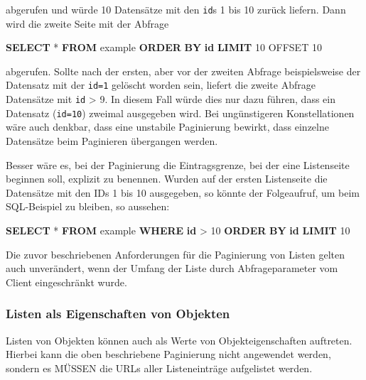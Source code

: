 \documentclass[,a4paper]{article}
\newenvironment{Shaded}{}{}
\newcommand{\KeywordTok}[1]{\textcolor[rgb]{0.00,0.44,0.13}{\textbf{{#1}}}}
\newcommand{\DecValTok}[1]{\textcolor[rgb]{0.25,0.63,0.44}{{#1}}}
\newcommand{\NormalTok}[1]{{#1}}
\begin{document}
abgerufen und würde 10 Datensätze mit den \texttt{id}s 1 bis 10 zurück
liefern. Dann wird die zweite Seite mit der Abfrage

\begin{Shaded}
\begin{Highlighting}[]
\KeywordTok{SELECT} \NormalTok{* }\KeywordTok{FROM} \NormalTok{example }\KeywordTok{ORDER} \KeywordTok{BY} \KeywordTok{id} \KeywordTok{LIMIT} \DecValTok{10} \NormalTok{OFFSET }\DecValTok{10}
\end{Highlighting}
\end{Shaded}

abgerufen. Sollte nach der ersten, aber vor der zweiten Abfrage
beispielsweise der Datensatz mit der \texttt{id=1} gelöscht worden sein,
liefert die zweite Abfrage Datensätze mit \texttt{id} \textgreater{} 9.
In diesem Fall würde dies nur dazu führen, dass ein Datensatz
(\texttt{id=10}) zweimal ausgegeben wird. Bei ungünstigeren
Konstellationen wäre auch denkbar, dass eine unstabile Paginierung
bewirkt, dass einzelne Datensätze beim Paginieren übergangen werden.

Besser wäre es, bei der Paginierung die Eintragsgrenze, bei der eine
Listenseite beginnen soll, explizit zu benennen. Wurden auf der ersten
Listenseite die Datensätze mit den IDs 1 bis 10 ausgegeben, so könnte
der Folgeaufruf, um beim SQL-Beispiel zu bleiben, so aussehen:

\begin{Shaded}
\begin{Highlighting}[]
\KeywordTok{SELECT} \NormalTok{* }\KeywordTok{FROM} \NormalTok{example }\KeywordTok{WHERE} \KeywordTok{id} \NormalTok{> }\DecValTok{10} \KeywordTok{ORDER} \KeywordTok{BY} \KeywordTok{id} \KeywordTok{LIMIT} \DecValTok{10}
\end{Highlighting}
\end{Shaded}

Die zuvor beschriebenen Anforderungen für die Paginierung von Listen
gelten auch unverändert, wenn der Umfang der Liste durch
Abfrageparameter vom Client eingeschränkt wurde.

\subsubsection{Listen als Eigenschaften von
Objekten}\label{listen-als-eigenschaften-von-objekten}

Listen von Objekten können auch als Werte von Objekteigenschaften
auftreten. Hierbei kann die oben beschriebene Paginierung nicht
angewendet werden, sondern es MÜSSEN die URLs aller Listeneinträge
aufgelistet werden.
\end{document}
